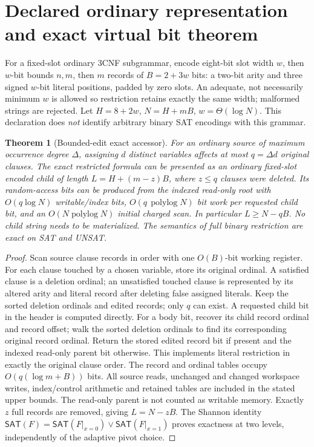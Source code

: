\documentclass[11pt]{article}
\newtheorem{theorem}{Theorem}
\newcommand{\SAT}{\mathsf{SAT}}
\begin{document}
\section{Declared ordinary representation and exact virtual bit theorem}
For a fixed-slot ordinary 3CNF subgrammar, encode eight-bit slot width $w$, then $w$-bit bounds $n,m$, then $m$ records of $B=2+3w$ bits: a two-bit arity and three signed $w$-bit literal positions, padded by zero slots. An adequate, not necessarily minimum $w$ is allowed so restriction retains exactly the same width; malformed strings are rejected. Let $H=8+2w$, $N=H+mB$, $w=\Theta(\log N)$. This declaration does \emph{not} identify arbitrary binary SAT encodings with this grammar.

\begin{theorem}[Bounded-edit exact accessor]
For an ordinary source of maximum occurrence degree $\Delta$, assigning $d$ distinct variables affects at most $q=\Delta d$ original clauses. The exact restricted formula can be presented as an ordinary fixed-slot encoded child of length $L=H+(m-z)B$, where $z\le q$ clauses were deleted. Its random-access bits can be produced from the indexed read-only root with $O(q\log N)$ writable/index bits, $O(q\,\operatorname{polylog}N)$ bit work per requested child bit, and an $O(N\operatorname{polylog}N)$ initial charged scan. In particular $L\ge N-qB$. No child string needs to be materialized. The semantics of full binary restriction are exact on SAT and UNSAT.
\end{theorem}
\begin{proof}
Scan source clause records in order with one $O(B)$-bit working register. For each clause touched by a chosen variable, store its original ordinal. A satisfied clause is a deletion ordinal; an unsatisfied touched clause is represented by its altered arity and literal record after deleting false assigned literals. Keep the sorted deletion ordinals and edited records; only $q$ can exist. A requested child bit in the header is computed directly. For a body bit, recover its child record ordinal and record offset; walk the sorted deletion ordinals to find its corresponding original record ordinal. Return the stored edited record bit if present and the indexed read-only parent bit otherwise. This implements literal restriction in exactly the original clause order. The record and ordinal tables occupy $O(q(\log m+B))$ bits. All source reads, unchanged and changed workspace writes, index/control arithmetic and retained tables are included in the stated upper bounds. The read-only parent is not counted as writable memory. Exactly $z$ full records are removed, giving $L=N-zB$. The Shannon identity $\SAT(F)=\SAT(F|_{x=0})\vee\SAT(F|_{x=1})$ proves exactness at two levels, independently of the adaptive pivot choice.
\end{proof}
\end{document}
